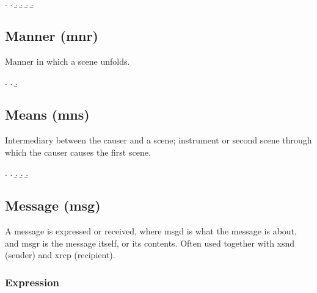 \documentclass[a4paper]{article}
\begin{document}
\ex.
\a. 
\b. 
\b. 
\b. 
\b. 


\clearpage
\subsection{Manner (\textsf{mnr})}
\label{sec:mnr}

Manner in which a scene unfolds.

\ex.
\a. 
\b. 


\clearpage
\subsection{Means (\textsf{mns})}
\label{sec:mns}

Intermediary between the causer and a scene; instrument or second scene through
which the causer causes the first scene.

\ex.
\a. 
\b. 
\b. 
\b. 


\clearpage
\subsection{Message (\textsf{msg})}
\label{sec:msg}

A message is expressed or received, where \textsf{msgd} is what the message is
about, and \textsf{msgr} is the message itself, or its contents. Often used
together with \textsf{xsnd} (sender) and \textsf{xrcp} (recipient).

\subsubsection{Expression}
\end{document}
